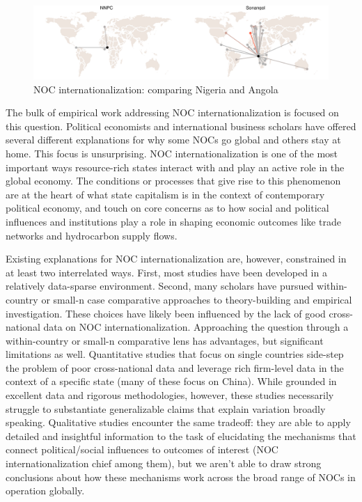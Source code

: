 \documentclass[11pt,]{book}
\begin{document}
\begin{figure}

{\centering \includegraphics{finalfig/sonanNNPC-1} 

}

\caption{NOC internationalization: comparing Nigeria and Angola}\label{fig:sonanNNPC}
\end{figure}

The bulk of empirical work addressing NOC internationalization is focused on this question. Political economists and international business scholars have offered several different explanations for why some NOCs go global and others stay at home. This focus is unsurprising. NOC internationalization is one of the most important ways resource-rich states interact with and play an active role in the global economy. The conditions or processes that give rise to this phenomenon are at the heart of what state capitalism is in the context of contemporary political economy, and touch on core concerns as to how social and political influences and institutions play a role in shaping economic outcomes like trade networks and hydrocarbon supply flows.

Existing explanations for NOC internationalization are, however, constrained in at least two interrelated ways. First, most studies have been developed in a relatively data-sparse environment. Second, many scholars have pursued within-country or small-n case comparative approaches to theory-building and empirical investigation. These choices have likely been influenced by the lack of good cross-national data on NOC internationalization. Approaching the question through a within-country or small-n comparative lens has advantages, but significant limitations as well. Quantitative studies that focus on single countries side-step the problem of poor cross-national data and leverage rich firm-level data in the context of a specific state (many of these focus on China). While grounded in excellent data and rigorous methodologies, however, these studies necessarily struggle to substantiate generalizable claims that explain variation broadly speaking. Qualitative studies encounter the same tradeoff: they are able to apply detailed and insightful information to the task of elucidating the mechanisms that connect political/social influences to outcomes of interest (NOC internationalization chief among them), but we aren't able to draw strong conclusions about how these mechanisms work across the broad range of NOCs in operation globally.
\end{document}
